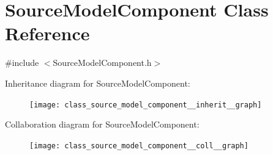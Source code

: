 \hypertarget{class_source_model_component}{\section{Source\-Model\-Component Class Reference}
\label{class_source_model_component}
}


{\ttfamily \#include $<$Source\-Model\-Component.\-h$>$}



Inheritance diagram for Source\-Model\-Component\-:\nopagebreak
\begin{figure}[H]
\begin{center}
\leavevmode
\texttt{[image: class\_source\_model\_component\_\_inherit\_\_graph]}
\end{center}
\end{figure}


Collaboration diagram for Source\-Model\-Component\-:\nopagebreak
\begin{figure}[H]
\begin{center}
\leavevmode
\texttt{[image: class\_source\_model\_component\_\_coll\_\_graph]}
\end{center}
\end{figure}
